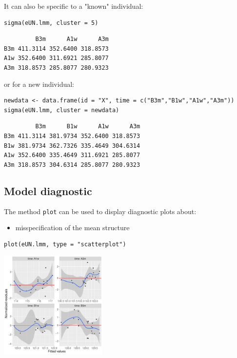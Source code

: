 \documentclass[12pt]{article}
\begin{document}
It can also be specific to a "known" individual:
\lstset{language=r,label= ,caption= ,captionpos=b,numbers=none}
\begin{lstlisting}
sigma(eUN.lmm, cluster = 5)
\end{lstlisting}

\begin{verbatim}
         B3m      A1w      A3m
B3m 411.3114 352.6400 318.8573
A1w 352.6400 311.6921 285.8077
A3m 318.8573 285.8077 280.9323
\end{verbatim}


or for a new individual:
\lstset{language=r,label= ,caption= ,captionpos=b,numbers=none}
\begin{lstlisting}
newdata <- data.frame(id = "X", time = c("B3m","B1w","A1w","A3m"))
sigma(eUN.lmm, cluster = newdata)
\end{lstlisting}

\begin{verbatim}
         B3m      B1w      A1w      A3m
B3m 411.3114 381.9734 352.6400 318.8573
B1w 381.9734 362.7326 335.4649 304.6314
A1w 352.6400 335.4649 311.6921 285.8077
A3m 318.8573 304.6314 285.8077 280.9323
\end{verbatim}



\clearpage

\subsection{Model diagnostic}
\label{sec:org5972ae0}

The method \texttt{plot} can be used to display diagnostic plots about:
\begin{itemize}
\item misspecification of the mean structure
\end{itemize}
\lstset{language=r,label= ,caption= ,captionpos=b,numbers=none}
\begin{lstlisting}
plot(eUN.lmm, type = "scatterplot")
\end{lstlisting}

\begin{center}
\includegraphics[width=0.4\textwidth]{./figures/diag-scatterplot.pdf}
\end{center}
\end{document}
